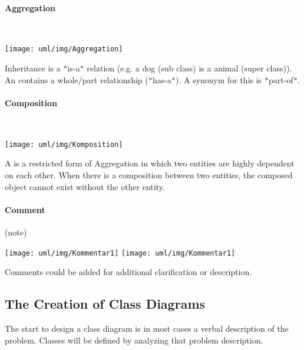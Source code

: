 \begin{minipage}[c]{0.45\linewidth}
\paragraph{Aggregation}\mbox{} \\
\begin{minipage}[c]{0.28\linewidth}
\texttt{[image: uml/img/Aggregation]}
\end{minipage}
\begin{minipage}[c]{0.7\linewidth}
Inheritance is a \verb|"|is-a\verb|"| relation (e.g. a dog (sub class) is a animal
(super class)). An  contains a whole/part
relationship (\verb|"|has-a\verb|"|). A synonym for this is \verb|"|part-of\verb|"|.
\end{minipage}
%
\ifslides
\newpage
\fi
\paragraph{Composition}\mbox{} \\
\begin{minipage}[c]{0.28\linewidth}
\texttt{[image: uml/img/Komposition]}
\end{minipage}
\begin{minipage}[c]{0.7\linewidth}
A  is a restricted form of Aggregation in which two
entities are highly dependent on each other. When there is a composition
between two entities, the composed object cannot exist without the other entity.
\end{minipage}
%
\ifslides
\newpage
\fi
\paragraph{Comment} (note)\\[2ex]
\begin{minipage}[c]{0.3\linewidth}
\ifslides
\texttt{[image: uml/img/Kommentar1]}
\else
\texttt{[image: uml/img/Kommentar1]}
\fi
\end{minipage}
\begin{minipage}[c]{0.69\linewidth}
Comments could be added for additional clarification or description.
\end{minipage}

\newpage
\subsection{The Creation of Class Diagrams}
The start to design a class diagram is in most cases a verbal description
of the problem. Classes will be defined by analyzing that problem
description.


\end{minipage}
